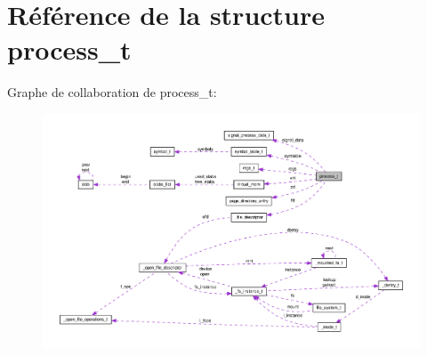 \hypertarget{structprocess__t}{\section{\-Référence de la structure process\-\_\-t}
\label{structprocess__t}
}


\-Graphe de collaboration de process\-\_\-t\-:\nopagebreak
\begin{figure}[H]
\begin{center}
\leavevmode
\includegraphics[width=350pt]{structprocess__t__coll__graph}
\end{center}
\end{figure}
